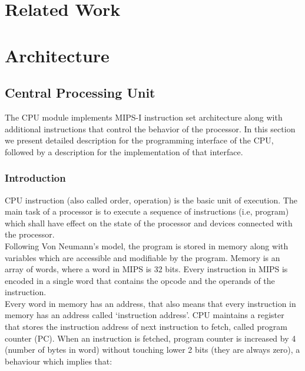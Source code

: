 \documentclass[oneside]{book}
\begin{document}


\chapter{Related Work}


\chapter{Architecture}

\section{Central Processing Unit}

The CPU module implements MIPS-I instruction set architecture along with
additional instructions that control the behavior of the processor. In this
section we present detailed description for the programming interface
of the CPU, followed by a description for the implementation of that
interface.

\subsection{Introduction}

CPU instruction (also called order, operation) is the basic unit
of execution. The main task of a processor is to execute a sequence
of instructions (i.e, program) which shall have effect on the state
of the processor and devices connected with the processor.\\

Following Von Neumann's model, the program is stored in memory along
with variables which are accessible and modifiable by the program.
Memory is an array of words, where a word in MIPS is 32 bits. Every
instruction in MIPS is encoded in a single word that contains
the opcode and the operands of the instruction.\\

Every word in memory has an address, that also means that every
instruction in memory has an address called `instruction address'.
CPU maintains a register that stores the instruction address of
next instruction to fetch, called program counter (PC). When an
instruction is fetched, program counter is increased by 4 (number
of bytes in word) without touching lower 2 bits (they are
always zero), a behaviour which implies that:
\end{document}
